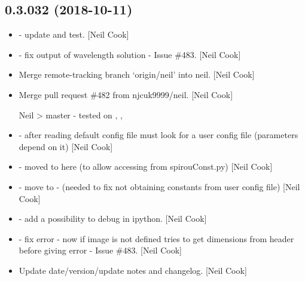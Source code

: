 \documentclass[a4paper,10pt,english]{report}
\begin{document}
\subsection{0.3.032 (2018-10-11)}
\label{\detokenize{misc/changelog:id298}}\begin{itemize}
\item {} 
 - update  and test. {[}Neil Cook{]}

\item {} 
 - fix output of wavelength solution - Issue \#483. {[}Neil
Cook{]}

\item {} 
Merge remote-tracking branch ‘origin/neil’ into neil. {[}Neil Cook{]}

\item {} 
Merge pull request \#482 from njcuk9999/neil. {[}Neil Cook{]}

Neil \textendash{}\textgreater{} master - tested on , , 

\item {} 
 - after reading default config file must look for a
user config file (parameters depend on it) {[}Neil Cook{]}

\item {} 
 - moved  to here (to allow
accessing from spirouConst.py) {[}Neil Cook{]}

\item {} 
 - move  to  -
(needed to fix not obtaining constants from user config file) {[}Neil
Cook{]}

\item {} 
 - add a possibility to debug in ipython. {[}Neil Cook{]}

\item {} 
 - fix error - now if image is not defined tries to get
dimensions from header before giving error - Issue \#483. {[}Neil Cook{]}

\item {} 
Update date/version/update notes and changelog. {[}Neil Cook{]}

\end{itemize}
\end{document}
